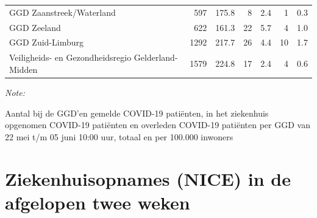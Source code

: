 \documentclass[
  english,
  man,floatsintext]{apa6}
\begin{document}
\begin{table}
\begin{threeparttable}
\begin{tabular}{lrrrrrr}
GGD Zaanstreek/Waterland & 597 & 175.8 & 8 & 2.4 & 1 & 0.3\\
GGD Zeeland & 622 & 161.3 & 22 & 5.7 & 4 & 1.0\\
GGD Zuid-Limburg & 1292 & 217.7 & 26 & 4.4 & 10 & 1.7\\
Veiligheids- en Gezondheidsregio Gelderland-Midden & 1579 & 224.8 & 17 & 2.4 & 4 & 0.6\\
\bottomrule
\end{tabular}
\begin{tablenotes}
\item \textit{Note: } 
\item Aantal bij de GGD’en gemelde COVID-19 patiënten, in het ziekenhuis opgenomen COVID-19 patiënten en overleden COVID-19 patiënten per GGD van 22 mei t/m 05 juni 10:00 uur, totaal en per 100.000 inwoners
\end{tablenotes}
\end{threeparttable}
\endgroup{}
\end{table}

\newpage

\hypertarget{ziekenhuisopnames-nice-in-de-afgelopen-twee-weken}{%
\section{Ziekenhuisopnames (NICE) in de afgelopen twee weken}\label{ziekenhuisopnames-nice-in-de-afgelopen-twee-weken}}
\end{document}
